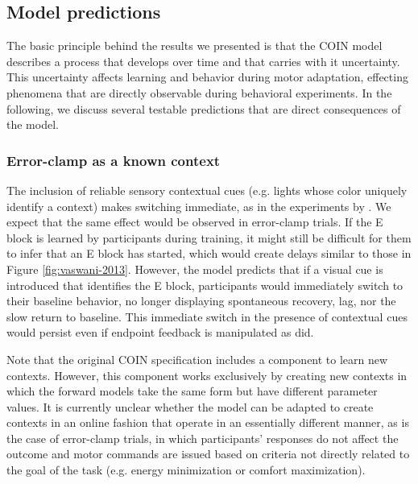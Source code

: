 \documentclass[a4paper,doc,floatsintext,natbib]{apa6}
\def \fref #1{Figure \ref{#1}}     %
\begin{document}
\subsection{Model predictions}
The basic principle behind the results we presented is that the COIN model describes a process that develops over time and that carries with it uncertainty. This uncertainty affects learning and behavior during motor adaptation, effecting phenomena that are directly observable during behavioral experiments. In the following, we discuss several testable predictions that are direct consequences of the model.  

\subsubsection{Error-clamp as a known context}
The inclusion of reliable sensory contextual cues (e.g. lights whose color uniquely identify a context) makes switching immediate, as in the experiments by \cite{Kim_Neural_2015}. We expect that the same effect would be observed in error-clamp trials. If the E block is learned by participants during training, it might still be difficult for them to infer that an E block has started, which would create delays similar to those in \fref{fig:vaswani-2013}. However, the model predicts that if a visual cue is introduced that identifies the E block, participants would immediately switch to their baseline behavior, no longer displaying spontaneous recovery, lag, nor the slow return to baseline. This immediate switch in the presence of contextual cues would persist even if endpoint feedback is manipulated as \cite{Vaswani_Decay_2013} did.

Note that the original COIN specification includes a component to learn new contexts. However, this component works exclusively by creating new contexts in which the forward models take the same form but have different parameter values. It is currently unclear whether the model can be adapted to create contexts in an online fashion that operate in an essentially different manner, as is the case of error-clamp trials, in which participants' responses do not affect the outcome and motor commands are issued based on criteria not directly related to the goal of the task (e.g. energy minimization or comfort maximization).
\end{document}
